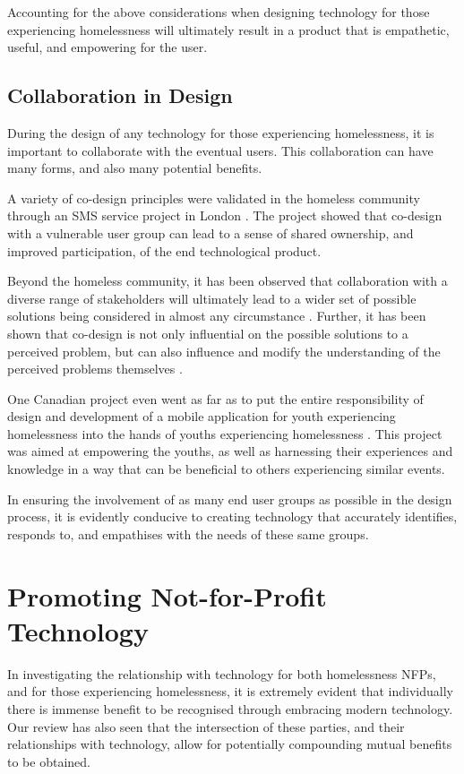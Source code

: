 Accounting for the above considerations when designing technology for those experiencing homelessness will ultimately result in a product that is empathetic, useful, and empowering for the user.

\subsection{Collaboration in Design}

During the design of any technology for those experiencing homelessness, it is important to collaborate with the eventual users. This collaboration can have many forms, and also many potential benefits.

A variety of co-design principles were validated in the homeless community through an SMS service project in London \cite{kwon2013co}. The project showed that co-design with a vulnerable user group can lead to a sense of shared ownership, and improved participation, of the end technological product.

Beyond the homeless community, it has been observed that collaboration with a diverse range of stakeholders will ultimately lead to a wider set of possible solutions being considered in almost any circumstance \cite{doberstein2016designing}. Further, it has been shown that co-design is not only influential on the possible solutions to a perceived problem, but can also influence and modify the understanding of the perceived problems themselves \cite{melles2012empower}.

One Canadian project even went as far as to put the entire responsibility of design and development of a mobile application for youth experiencing homelessness into the hands of youths experiencing homelessness \cite{buccieri2015empowering}. This project was aimed at empowering the youths, as well as harnessing their experiences and knowledge in a way that can be beneficial to others experiencing similar events.

In ensuring the involvement of as many end user groups as possible in the design process, it is evidently conducive to creating technology that accurately identifies, responds to, and empathises with the needs of these same groups.

\section{Promoting Not-for-Profit Technology}

In investigating the relationship with technology for both homelessness NFPs, and for those experiencing homelessness, it is extremely evident that individually there is immense benefit to be recognised through embracing modern technology. Our review has also seen that the intersection of these parties, and their relationships with technology, allow for potentially compounding mutual benefits to be obtained. 

